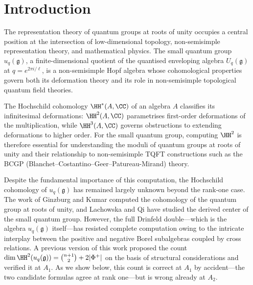 \begin{abstract}
The corrected Mastnak--Witherspoon long exact sequence then yields, at $A_2$ and $\ell = 3$,
\[
  \dim \HH^2\bigl(u_q(\mathfrak{sl}_3), \CC\bigr) \;=\; n^2 - \dim \tilde{H}^2_b(B^+) \;=\; 9 - 1 \;=\; 8 \;=\; 2 + 2 \cdot 3 \;=\; \operatorname{rank}(\mathfrak{sl}_3) + 2|\Phi^+_{\mathfrak{sl}_3}|,
\]
\emph{not} $9 = \binom{3}{2} + 2 \cdot 3$ as the original conjecture predicted. This is the first direct verification of the $A_2$ case and resolves, in the negative, the previously open status of the $\binom{n+1}{2} + 2|\Phi^+|$ conjecture at $A_2$. We extract explicit cocycle representatives for the $A_1$ case and identify the mixed $E$--$F$ class as the image of the connecting homomorphism $\delta: \tilde{H}^1_b(B^+) \to \HH^2(D(B^+))$ in the Mastnak--Witherspoon long exact sequence, giving the structural decomposition $\dim \HH^2(D(B^+)) = \dim \operatorname{im} \bar\iota + \dim \operatorname{im} \delta$, verified numerically at $A_1$ ($2 + 1 = 3$).
\end{abstract}

\section{Introduction}
\label{sec:intro}
The representation theory of quantum groups\cite{Dr87} at roots of unity occupies a central position at the intersection of low-dimensional topology, non-semisimple representation theory, and mathematical physics. The small quantum group $u_q(\mathfrak{g})$, a finite-dimensional quotient of the quantised enveloping algebra $U_q(\mathfrak{g})$ at $q = e^{2\pi i/\ell}$, is a non-semisimple Hopf algebra whose cohomological properties govern both its deformation theory and its role in non-semisimple topological quantum field theories.

The Hochschild cohomology $\HH^*(A, \CC)$ of an algebra $A$ classifies its infinitesimal deformations: $\HH^2(A, \CC)$ parametrises first-order deformations of the multiplication, while $\HH^3(A, \CC)$ governs obstructions to extending deformations to higher order. For the small quantum group, computing $\HH^2$ is therefore essential for understanding the moduli of quantum groups at roots of unity and their relationship to non-semisimple TQFT constructions such as the BCGP (Blanchet--Costantino--Geer--Patureau-Mirand) theory.

Despite the fundamental importance of this computation, the Hochschild cohomology of $u_q(\mathfrak{g})$ has remained largely unknown beyond the rank-one case. The work of Ginzburg and Kumar\cite{GK93} computed the cohomology of the quantum group at roots of unity, and Lachowska and Qi\cite{LQ21} have studied the derived center of the small quantum group. However, the full Drinfeld double---which is the algebra $u_q(\mathfrak{g})$ itself---has resisted complete computation owing to the intricate interplay between the positive and negative Borel subalgebras coupled by cross relations. A previous version of this work proposed the count $\dim \HH^2(u_q(\mathfrak{g})) = \binom{n+1}{2} + 2|\Phi^+|$ on the basis of structural considerations and verified it at $A_1$. As we show below, this count is correct at $A_1$ by accident---the two candidate formulas agree at rank one---but is wrong already at $A_2$.

